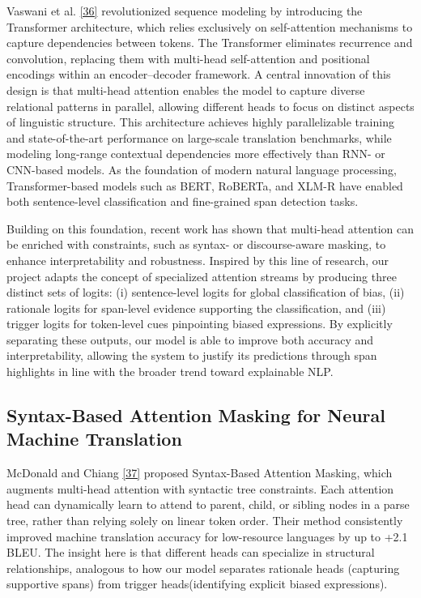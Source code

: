 \documentclass[12pt,oneside,openright,a4paper]{cpe-english-project}
\begin{document}
Vaswani et al. \hyperlink{bib:ref36}{[36]} revolutionized sequence modeling by introducing the Transformer architecture, which relies exclusively on self-attention mechanisms to capture dependencies between tokens. The Transformer eliminates recurrence and convolution, replacing them with multi-head self-attention and positional encodings within an encoder--decoder framework. A central innovation of this design is that multi-head attention enables the model to capture diverse relational patterns in parallel, allowing different heads to focus on distinct aspects of linguistic structure. This architecture achieves highly parallelizable training and state-of-the-art performance on large-scale translation benchmarks, while modeling long-range contextual dependencies more effectively than RNN- or CNN-based models. As the foundation of modern natural language processing, Transformer-based models such as BERT, RoBERTa, and XLM-R have enabled both sentence-level classification and fine-grained span detection tasks.

Building on this foundation, recent work has shown that multi-head attention can be enriched with constraints, such as syntax- or discourse-aware masking, to enhance interpretability and robustness. Inspired by this line of research, our project adapts the concept of specialized attention streams by producing three distinct sets of logits: (i) sentence-level logits for global classification of bias, (ii) rationale logits for span-level evidence supporting the classification, and (iii) trigger logits for token-level cues pinpointing biased expressions. By explicitly separating these outputs, our model is able to improve both accuracy and interpretability, allowing the system to justify its predictions through span highlights in line with the broader trend toward explainable NLP.

\subsection{Syntax-Based Attention Masking for Neural Machine Translation}

McDonald and Chiang \hyperlink{bib:ref37}{[37]} proposed Syntax-Based Attention Masking, which augments multi-head attention with syntactic tree constraints. Each attention head can dynamically learn to attend to parent, child, or sibling nodes in a parse tree, rather than relying solely on linear token order. Their method consistently improved machine translation accuracy for low-resource languages by up to +2.1 BLEU. The insight here is that different heads can specialize in structural relationships, analogous to how our model separates rationale heads (capturing supportive spans) from trigger heads(identifying explicit biased expressions).
\end{document}
